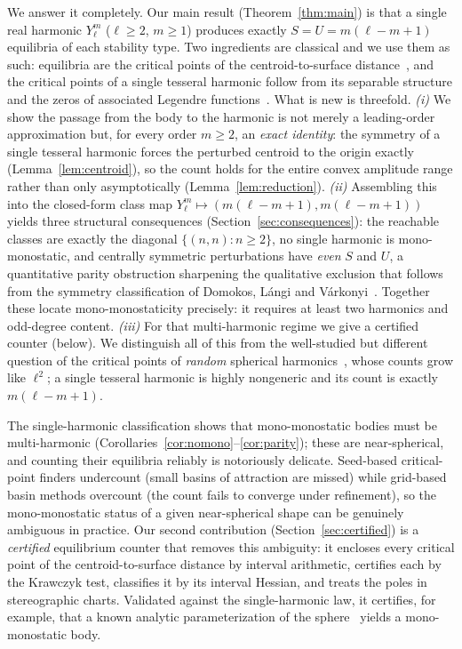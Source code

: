 \documentclass[11pt,a4paper]{article}
\theoremstyle{definition}
\begin{document}
We answer it completely. Our main result (Theorem~\ref{thm:main}) is that a single real harmonic $Y_\ell^m$
($\ell\ge2$, $m\ge1$) produces exactly $S=U=m(\ell-m+1)$ equilibria of each stability type. Two ingredients are
classical and we use them as such: equilibria are the critical points of the centroid-to-surface
distance~\cite{varkonyi2006b}, and the critical points of a single tesseral harmonic follow from its separable
structure and the zeros of associated Legendre functions~\cite{hobson,szego}. What is new is threefold.
\emph{(i)} We show the passage from the body to the harmonic is not merely a leading-order approximation but,
for every order $m\ge2$, an \emph{exact identity}: the symmetry of a single tesseral harmonic forces the
perturbed centroid to the origin exactly (Lemma~\ref{lem:centroid}), so the count holds for the entire convex
amplitude range rather than only asymptotically (Lemma~\ref{lem:reduction}). \emph{(ii)} Assembling this into
the closed-form class map $Y_\ell^m\mapsto(m(\ell-m+1),m(\ell-m+1))$ yields three structural consequences
(Section~\ref{sec:consequences}): the reachable classes are exactly the diagonal $\{(n,n):n\ge2\}$, no single
harmonic is mono-monostatic, and centrally symmetric perturbations have \emph{even} $S$ and $U$, a quantitative
parity obstruction sharpening the qualitative exclusion that follows from the symmetry classification of
Domokos, L\'angi and V\'arkonyi~\cite{domokos2023symmetry}. Together these locate mono-monostaticity precisely:
it requires at least two harmonics and odd-degree content. \emph{(iii)} For that multi-harmonic regime we give a
certified counter (below). We distinguish all of this from the well-studied but different question of the
critical points of \emph{random} spherical harmonics~\cite{nicolaescu,cammarota}, whose counts grow like
$\ell^2$; a single tesseral harmonic is highly nongeneric and its count is exactly $m(\ell-m+1)$.

The single-harmonic classification shows that mono-monostatic bodies must be multi-harmonic
(Corollaries~\ref{cor:nomono}--\ref{cor:parity}); these are near-spherical, and counting their equilibria
reliably is notoriously delicate. Seed-based critical-point finders undercount (small basins of attraction
are missed) while grid-based basin methods overcount (the count fails to converge under refinement), so the
mono-monostatic status of a given near-spherical shape can be genuinely ambiguous in practice. Our second
contribution (Section~\ref{sec:certified}) is a \emph{certified} equilibrium counter that removes this
ambiguity: it encloses every critical point of the centroid-to-surface distance by interval arithmetic,
certifies each by the Krawczyk test, classifies it by its interval Hessian, and treats the poles in
stereographic charts. Validated against the single-harmonic law, it certifies, for example, that a known
analytic parameterization of the sphere~\cite{sloan2023} yields a mono-monostatic body.
\end{document}
